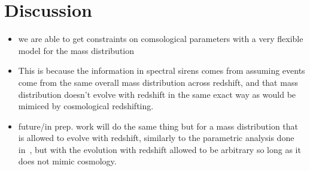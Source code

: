 \documentclass[]{aastex631}
\begin{document}
\section{Discussion}
\label{sec:discussion}
\begin{itemize}
    \item we are able to get constraints on comsological parameters with a very flexible model for the mass distribution
    \item This is because the information in spectral sirens comes from assuming events come from the same overall mass distribution across redshift, and that mass distribution doesn't evolve with redshift in the same exact way as would be mimiced by cosmological redshifting.
    \item future/in prep. work will do the same thing but for a mass distribution that is allowed to evolve with redshift, similarly to the parametric analysis done in~\cite{ezquiaga_spectral_2022}, but with the evolution with redshift allowed to be arbitrary so long as it does not mimic cosmology.
\end{itemize}


\end{document}
